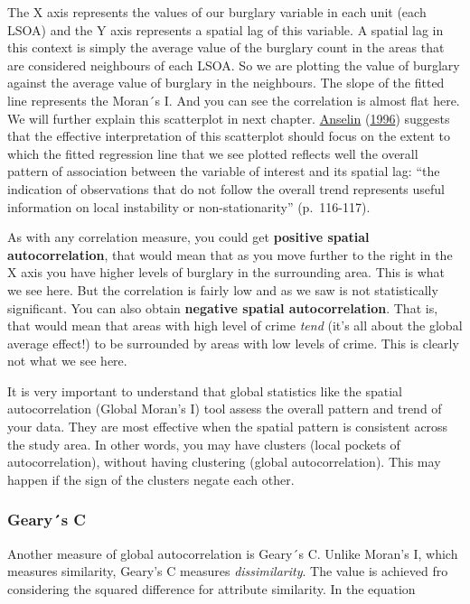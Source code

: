 \documentclass[
  krantz2]{krantz}
\begin{document}
The X axis represents the values of our burglary variable in each unit (each LSOA) and the Y axis represents a spatial lag of this variable. A spatial lag in this context is simply the average value of the burglary count in the areas that are considered neighbours of each LSOA. So we are plotting the value of burglary against the average value of burglary in the neighbours. The slope of the fitted line represents the Moran´s I. And you can see the correlation is almost flat here. We will further explain this scatterplot in next chapter. \protect\hyperlink{ref-Anselin_1996}{Anselin} (\protect\hyperlink{ref-Anselin_1996}{1996}) suggests that the effective interpretation of this scatterplot should focus on the extent to which the fitted regression line that we see plotted reflects well the overall pattern of association between the variable of interest and its spatial lag: ``the indication of observations that do not follow the overall trend represents useful information on local instability or non-stationarity'' (p.~116-117).

As with any correlation measure, you could get \textbf{positive spatial autocorrelation}, that would mean that as you move further to the right in the X axis you have higher levels of burglary in the surrounding area. This is what we see here. But the correlation is fairly low and as we saw is not statistically significant. You can also obtain \textbf{negative spatial autocorrelation}. That is, that would mean that areas with high level of crime \emph{tend} (it's all about the global average effect!) to be surrounded by areas with low levels of crime. This is clearly not what we see here.

It is very important to understand that global statistics like the spatial autocorrelation (Global Moran's I) tool assess the overall pattern and trend of your data. They are most effective when the spatial pattern is consistent across the study area. In other words, you may have clusters (local pockets of autocorrelation), without having clustering (global autocorrelation). This may happen if the sign of the clusters negate each other.

\hypertarget{gearys-c}{%
\subsubsection{Geary´s C}\label{gearys-c}}

Another measure of global autocorrelation is Geary´s C. Unlike Moran's I, which measures similarity, Geary's C measures \emph{dissimilarity}. The value is achieved fro considering the squared difference for attribute similarity. In the equation
\end{document}
